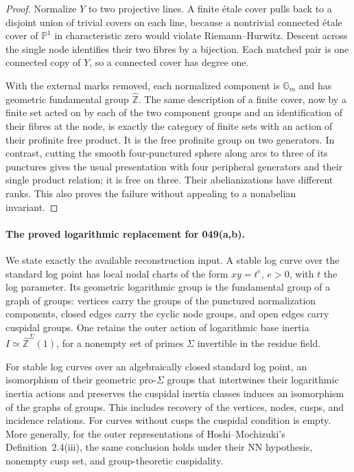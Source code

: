 \begin{proof}
Normalize $Y$ to two projective lines. A finite \'etale cover pulls
back to a disjoint union of trivial covers on each line, because a
nontrivial connected \'etale cover of $\mathbb P^1$ in characteristic
zero would violate Riemann--Hurwitz. Descent across the single node
identifies their two fibres by a bijection. Each matched pair is one
connected copy of $Y$, so a connected cover has degree one.

With the external marks removed, each normalized component is
$\mathbb G_m$ and has geometric fundamental group
$\widehat{\mathbb Z}$. The same description of a finite cover,
now by a finite set acted on by each of the two component groups
and an identification of their fibres at the node, is exactly the
category of finite sets with an action of their profinite free
product. It is the free profinite group on two generators. In
contrast, cutting the smooth four-punctured sphere along arcs to
three of its punctures gives the usual presentation with four
peripheral generators and their single product relation; it is
free on three. Their abelianizations have different ranks. This
also proves the failure without appealing to a nonabelian invariant.
\end{proof}

\paragraph{The proved logarithmic replacement for 049(a,b).}
We state exactly the available reconstruction input. A stable log
curve over the standard log point has local nodal charts of the form
$xy=t^e$, $e>0$, with $t$ the log parameter. Its geometric
logarithmic group is the fundamental group of a graph of groups:
vertices carry the groups of the punctured normalization components,
closed edges carry the cyclic node groups, and open edges carry
cuspidal groups. One retains the outer action of logarithmic base
inertia $I\simeq\widehat{\mathbb Z}^{\Sigma}(1)$, for a nonempty
set of primes $\Sigma$ invertible in the residue field.

\begin{theorem}
\label{A:log-graphicity}
For stable log curves over an algebraically closed standard log
point, an isomorphism of their geometric pro-$\Sigma$ groups that
intertwines their logarithmic inertia actions and preserves the
cuspidal inertia classes induces an isomorphism of the graphs of
groups. This includes recovery of the vertices, nodes, cusps, and
incidence relations. For curves without cusps the cuspidal condition
is empty. More generally, for the outer representations of
Hoshi--Mochizuki's Definition~2.4(iii), the same conclusion holds
under their NN hypothesis, nonempty cusp set, and group-theoretic
cuspidality.
\end{theorem}

